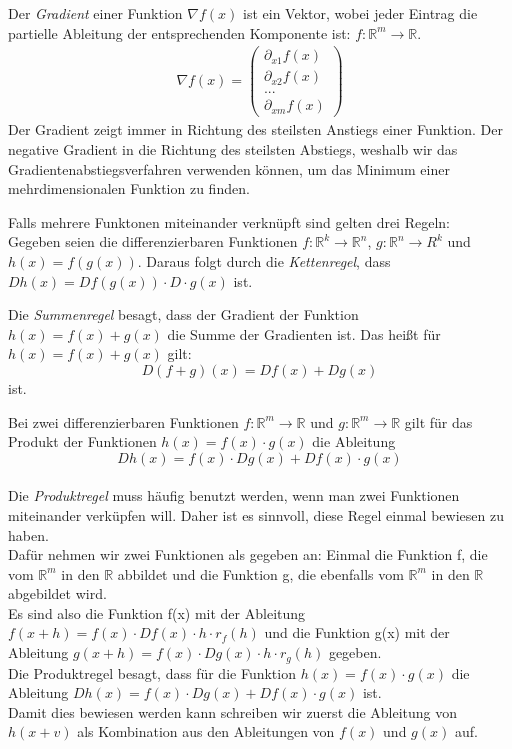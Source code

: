 Der \emph{Gradient} einer Funktion  $\nabla f(x)$ ist ein Vektor, wobei jeder Eintrag die partielle Ableitung der entsprechenden Komponente ist:
$f:\mathbb{R}^m\rightarrow\mathbb{R}$.
\begin{equation*} \begin{split} \nabla f(x) = \left( \begin{array}{c}
\partial_{x1} f(x) \\
\partial_{x2} f(x) \\
... \\
\partial_{xm} f(x)
\end{array}
\right)
\end{split} \end{equation*} 
Der Gradient zeigt immer in Richtung des steilsten Anstiegs einer Funktion. Der negative Gradient in die Richtung des steilsten Abstiegs, weshalb wir das Gradientenabstiegsverfahren verwenden können, um das Minimum einer mehrdimensionalen Funktion zu finden.


Falls mehrere Funktonen miteinander verknüpft sind gelten drei Regeln: \\
Gegeben seien die differenzierbaren Funktionen $f:\mathbb{R}^k\rightarrow\mathbb{R}^n$, $g:\mathbb{R}^n\rightarrow{R}^k$ und $h(x)=f(g(x))$. Daraus folgt durch die \emph{Kettenregel}, dass $Dh(x) = Df(g(x)) \cdot D \cdot g(x)$ ist.


Die \emph{Summenregel} besagt, dass der Gradient der Funktion $h(x)=f(x)+g(x)$ die Summe der Gradienten ist. Das heißt für $h(x) = f(x) + g(x)$ gilt:
\begin{equation*} D(f + g)(x)=Df(x)+Dg(x)\end{equation*} ist.

Bei zwei differenzierbaren Funktionen $f:\mathbb{R}^m\rightarrow\mathbb{R}$ und $g:\mathbb{R}^m\rightarrow\mathbb{R}$ gilt für das Produkt der Funktionen $h(x)=f(x) \cdot g(x)$ die Ableitung \begin{equation*}Dh(x)=f(x) \cdot Dg(x)+Df(x) \cdot g(x)\end{equation*}
\\
Die \emph{Produktregel} muss häufig benutzt werden, wenn man zwei Funktionen miteinander verküpfen will. Daher ist es sinnvoll, diese Regel einmal bewiesen zu haben.
 \\
Dafür nehmen wir zwei Funktionen als gegeben an: Einmal die Funktion f, die vom $\mathbb{R}^m$ in den $\mathbb{R}$ abbildet und die Funktion g, die ebenfalls vom $\mathbb{R}^m$ in den $\mathbb{R}$ abgebildet wird. \\
Es sind also die Funktion f(x) mit der Ableitung $f(x+h) = f(x) \cdot Df(x) \cdot h \cdot r_{f}(h)$ und die Funktion g(x) mit der Ableitung $g(x+h) = f(x) \cdot Dg(x) \cdot h \cdot r_{g}(h)$ gegeben. \\
Die Produktregel besagt, dass für die Funktion $h(x) = f(x) \cdot g(x)$ die Ableitung $Dh(x) = f(x) \cdot Dg(x) + Df(x) \cdot g(x)$ %
 ist. \\
Damit dies bewiesen werden kann schreiben wir zuerst die Ableitung von $h(x+v)$ als Kombination aus den Ableitungen von $f(x)$ und $g(x)$ auf.

